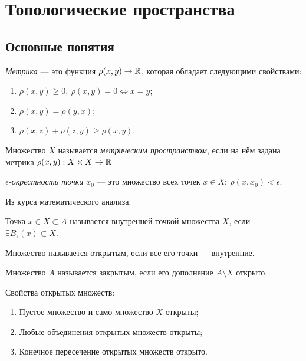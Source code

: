 \section{Топологические пространства}
\subsection{Основные понятия}
\begin{definition}
    \textit{Метрика} — это функция $\rho(x,y) \to \mathbb{R}$, которая обладает следующими свойствами:
    \begin{enumerate}
        \item $\rho(x,y) \geq 0, \ \rho(x,y) = 0 \Leftrightarrow x = y$;
        \item $\rho(x,y) = \rho(y,x)$;
        \item $\rho(x,z) + \rho(z,y) \geq \rho(x,y)$.
    \end{enumerate}
\end{definition}

\begin{definition}
    Множество $X$ называется \textit{метрическим пространством}, если на нём задана метрика $\rho(x,y): X \times X \to \mathbb{R}$.
\end{definition}

\begin{definition}
    \textit{$\epsilon$-окрестность точки $x_0$} — это множество всех точек $x \in X: \ \rho(x, x_0) < \epsilon$.
\end{definition}

Из курса математического анализа.
\begin{definition}
    Точка $x \in X \subset A$ называется внутренней точкой множества $X$, если $\exists B_{\epsilon} (x) \subset X$.
\end{definition}

\begin{definition}
    Множество называется открытым, если все его точки — внутренние.
\end{definition}

\begin{definition}
    Множество $A$ называется закрытым, если его дополнение $A \setminus X$ открыто.
\end{definition}

Свойства открытых множеств:
\begin{enumerate}
    \item Пустое множество и само множество $X$ открыты;
    \item Любые объединения открытых множеств открыты;
    \item Конечное пересечение открытых множеств открыто.
\end{enumerate}

